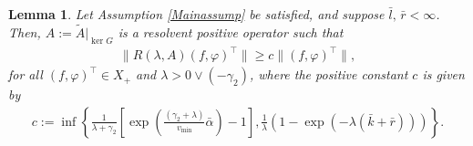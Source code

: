 \documentclass[onecolumn]{autart}
\def\la{\lambda}
\newtheorem{lemma}{Lemma}[section]
\numberwithin{equation}{section}
\begin{document}
	\begin{lemma}\label{resolvent-estimates}
		Let Assumption \ref{Mainassump} be satisfied, and suppose $\bar{l},\,\bar{r}<\infty$. Then, ${A}:=\tilde{A}|_{ \ker G}$  {is a} resolvent positive operator such that
		\begin{align}\label{inverse-estimate-transport}
			\|R(\lambda,{A})(f,\varphi)^{\top}\|\geq c\|(f,\varphi)^{\top}\|,
		\end{align}
		for all $(f,\varphi)^{\top}\in X_+$ and $\lambda>0\vee ({-\gamma_2})$, where the positive constant $c$ is given by
		\begin{align}\label{constant}
			c:=\inf\left\{\frac{1}{\la+\gamma_2}\left[ {{\exp}}\left(\frac{(\gamma_2+\la)}{v_{\min}}\bar{\alpha}\right)-1\right], \frac{1}{\lambda}	\left(1-{{\exp}}(-\lambda (\bar{k}+\bar{r}))\right)\right\}.
		\end{align}
	\end{lemma}
	
\end{document}
